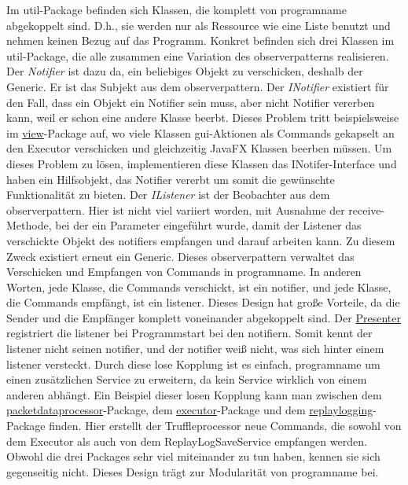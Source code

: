 \medskip
Im util-Package befinden sich Klassen, die komplett von \gls{programname} abgekoppelt
sind. D.h., sie werden nur als Ressource wie eine Liste benutzt und nehmen keinen
Bezug auf das Programm. Konkret befinden sich drei Klassen im util-Package, die alle zusammen eine
Variation des \gls{observerpattern}s realisieren. Der \textit{Notifier} ist dazu da,
ein beliebiges Objekt zu verschicken, deshalb der Generic. Er ist das Subjekt aus
dem \gls{observerpattern}.
\newline
\newline
Der \textit{INotifier} existiert für den Fall, dass ein
Objekt ein Notifier sein muss, aber nicht Notifier vererben kann, weil er
schon eine andere Klasse beerbt. Dieses Problem tritt beispielsweise im
\hyperref[subsec:view]{view}-Package auf, wo viele Klassen \gls{gui}-Aktionen als Commands
gekapselt an den Executor verschicken und gleichzeitig JavaFX Klassen beerben müssen.
Um dieses Problem zu lösen, implementieren diese Klassen das INotifer-Interface
und haben ein Hilfsobjekt, das Notifier vererbt um somit die gewünschte Funktionalität zu
bieten.
\newline
\newline
Der \textit{IListener} ist der Beobachter aus dem \gls{observerpattern}. Hier ist nicht
viel variiert worden, mit Ausnahme der receive-Methode, bei der ein Parameter eingeführt
wurde, damit der Listener das verschickte Objekt des \gls{notifier}s empfangen und darauf arbeiten kann. Zu diesem Zweck existiert erneut ein Generic.
\newline
\newline
Dieses \gls{observerpattern} verwaltet das Verschicken und Empfangen von Commands in
\gls{programname}. In anderen Worten, jede Klasse, die Commands verschickt, ist ein
\gls{notifier}, und jede Klasse, die Commands empfängt, ist ein \gls{listener}. Dieses Design
hat große Vorteile, da die Sender und die Empfänger komplett voneinander abgekoppelt
sind. Der \hyperref[subsec:presenter]{Presenter} registriert die \gls{listener} bei Programmstart
bei den \gls{notifier}n. Somit kennt der \gls{listener} nicht seinen \gls{notifier}, und der
\gls{notifier} weiß nicht, was sich hinter einem \gls{listener} versteckt. Durch diese lose
Kopplung ist es einfach, \gls{programname} um einen zusätzlichen Service zu erweitern,
da kein Service wirklich von einem anderen abhängt.
\newline
\newline
Ein Beispiel dieser losen Kopplung kann man zwischen dem
\hyperref[subsubsec:packetdataprocessor]{packetdataprocessor}-Package, dem
\hyperref[subsubsec:executor]{executor}-Package und dem
\hyperref[subsubsec:replaylogging]{replaylogging}-Package finden. Hier erstellt
der Truffleprocessor neue Commands, die sowohl von dem Executor als auch von dem
ReplayLogSaveService empfangen werden. Obwohl die drei Packages sehr viel
miteinander zu tun haben, kennen sie sich gegenseitig nicht. Dieses Design
trägt zur Modularität von \gls{programname} bei.
